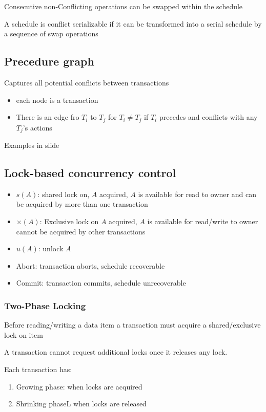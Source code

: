 \documentclass{article}
\begin{document}
Consecutive non-Conflicting operations can be swapped within the schedule

A schedule is conflict serializable if it can be transformed into a serial schedule by a sequence of swap operations

\subsection{Precedure graph}
Captures all potential conflicts between transactions
\begin{itemize}
  \item each node is a transaction
  \item There is an edge fro $T_i$ to $T_j$ for $T_i \neq T_j$ if $T_i$ precedes and conflicts with any $T_j$'s actions
\end{itemize}
Examples in slide

\subsection{Lock-based concurrency control}
\begin{itemize}
  \item $s(A)$: shared lock on, $A$ acquired, $A$ is available for read to owner and can be acquired by more than one transaction
  \item $\times(A)$: Exclusive lock on $A$ acquired, $A$ is available for read/write to owner cannot be acquired by other transactions
  \item $u(A)$: unlock  $A$
  \item Abort: transaction aborts, schedule recoverable
  \item Commit: transaction commits, schedule unrecoverable
\end{itemize}

\subsubsection*{Two-Phase Locking}
Before reading/writing a data item a transaction must acquire a shared/exclusive lock on item

A transaction cannot request additional locks once it releases any lock.

Each transaction has:
\begin{enumerate}
  \item Growing phase: when locks are acquired
  \item Shrinking phaseL when locks are released
\end{enumerate}
\end{document}
